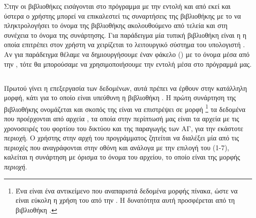 \documentclass[12pt]{report}
\begin{document}
Στην {} οι βιβλιοθήκες εισάγονται στο πρόγραμμα με την εντολή {} και από εκεί και ύστερα ο χρήστης μπορεί να επικαλεστεί τις συναρτήσεις της βιβλιοθήκης με το να πληκτρολογήσει το όνομα της
βιβλιοθήκης ακολουθούμενο από τελεία και στη συνέχεια το όνομα της συνάρτησης. Για παράδειγμα μία τυπική βιβλιοθήκη είναι η {} η οποία επιτρέπει στον χρήστη να χειρίζεται το λειτουργικό σύστημα του υπολογιστή
{}. Αν για παράδειγμα θέλαμε να δημιουργήσουμε έναν φάκελο ({}) με το όνομα {} μέσα από την {}, τότε θα μπορούσαμε να χρησιμοποιήσουμε την 
εντολή {\em{{}}} μέσα στο πρόγραμμά μας. 

\subsection{{}}
Πρωτού γίνει η επεξεργασία των δεδομένων, αυτά πρέπει να έρθουν στην κατάλληλη μορφή, κάτι για το οποίο είναι υπεύθυνη η βιβλιοθήκη {}. Η πρώτη συνάρτηση της βιβλιοθήκης ονομάζεται 
{\textbf{{}}} και σκοπός της είναι να επιστρέψει σε μορφή {}\footnote{Ένα {} είναι ένα αντικείμενο που αναπαριστά δεδομένα μορφής πίνακα, ώστε να είναι εύκολη η χρήση 
του από την {}. Η δυνατότητα αυτή προσφέρεται από τη βιβλιοθήκη {}.} τα δεδομένα που προέρχονται από αρχεία {}, τα οποία στην περίπτωσή μας είναι τα αρχεία με τις χρονοσειρές 
του φορτίου του δικτύου και της παραγωγής των ΑΓ, για την εκάστοτε περιοχή. Ο χρήστης στην αρχή του προγράμματος ζητείται να διαλέξει μία από τις περιοχές που αναγράφονται στην οθόνη και ανάλογα με την επιλογή του (1-7), καλείται η 
συνάρτηση με όρισμα το όνομα του αρχείου, το οποίο είναι της μορφής \textit{περιοχή}{}.

{}
\end{document}
